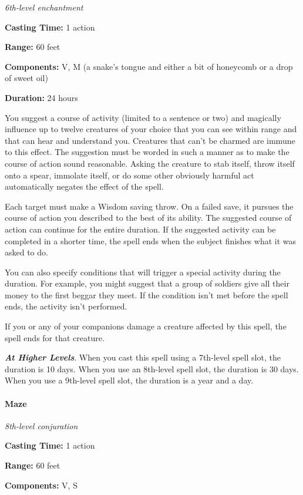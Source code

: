 \documentclass[
]{article}
\begin{document}
\emph{6th-level enchantment}

\textbf{Casting Time:} 1 action

\textbf{Range:} 60 feet

\textbf{Components:} V, M (a snake's tongue and either a bit of
honeycomb or a drop of sweet oil)

\textbf{Duration:} 24 hours

You suggest a course of activity (limited to a sentence or two) and
magically influence up to twelve creatures of your choice that you can
see within range and that can hear and understand you. Creatures that
can't be charmed are immune to this effect. The suggestion must be
worded in such a manner as to make the course of action sound
reasonable. Asking the creature to stab itself, throw itself onto a
spear, immolate itself, or do some other obviously harmful act
automatically negates the effect of the spell.

Each target must make a Wisdom saving throw. On a failed save, it
pursues the course of action you described to the best of its ability.
The suggested course of action can continue for the entire duration. If
the suggested activity can be completed in a shorter time, the spell
ends when the subject finishes what it was asked to do.

You can also specify conditions that will trigger a special activity
during the duration. For example, you might suggest that a group of
soldiers give all their money to the first beggar they meet. If the
condition isn't met before the spell ends, the activity isn't performed.

If you or any of your companions damage a creature affected by this
spell, the spell ends for that creature.

\emph{\textbf{At Higher Levels}}. When you cast this spell using a
7th-level spell slot, the duration is 10 days. When you use an 8th-level
spell slot, the duration is 30 days. When you use a 9th-level spell
slot, the duration is a year and a day.

\hypertarget{maze}{%
\paragraph{Maze}\label{maze}}

\emph{8th-level conjuration}

\textbf{Casting Time:} 1 action

\textbf{Range:} 60 feet

\textbf{Components:} V, S
\end{document}
